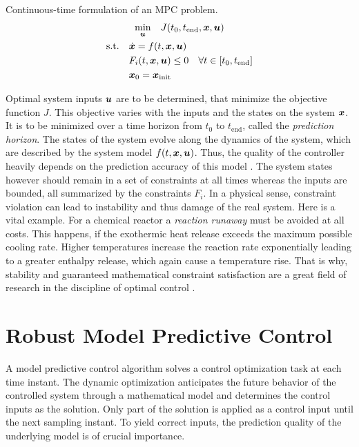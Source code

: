 \begin{definition} Continuous-time formulation of an MPC problem.
    \label{theory:def: general mpc}
    \[
        \begin{gathered}
            \underset{{\bm{u}}}{\min} \quad  J(t_0, t_\text{end}, {\bm{x}}, {\bm{u}}) \\
            \begin{aligned}
                \text{s.t.} \quad &\dot{{\bm{x}}} = f(t, {\bm{x}}, {\bm{u}}) \\
                & F_i(t, {\bm{x}}, {\bm{u}}) \leq 0 \quad \forall t \in [t_0, t_\text{end}] \\
                & {\bm{x}}_0 = {\bm{x}}_\text{init}
            \end{aligned}
        \end{gathered}
    \]
\end{definition}

Optimal system inputs ${\bm{u}}$ are to be determined, that minimize the objective function $J$. This objective
varies with the inputs and the states on the system ${\bm{x}}$. It is to be minimized over a time horizon
from $t_0$ to $t_\text{end}$, called the \emph{prediction horizon}. The states of the system evolve along
the dynamics of the system, which are described by the system model $f(t, {\bm{x}}, {\bm{u}})$. Thus, the quality
of the controller heavily depends on the prediction accuracy of this model \cite{lucia2013}.
The system states however should remain in a set of constraints at all times whereas the inputs
are bounded, all summarized by the constraints $F_i$. In a physical sense, constraint violation can lead to 
instability and thus damage of the real system. Here is a vital example.
For a chemical reactor a \emph{reaction runaway}
must be avoided at all costs. This happens, if the exothermic heat release exceeds the maximum possible
cooling rate. Higher temperatures increase the reaction rate exponentially leading to a greater 
enthalpy release, which again cause a temperature rise. That is why, stability and guaranteed mathematical constraint satisfaction
are a great field of research in the discipline of optimal control \cite{}.


\section{Robust Model Predictive Control}

A model predictive control algorithm solves a control optimization task at each time instant.
The dynamic optimization anticipates the future behavior of the controlled system through
a mathematical model and determines the control inputs as the solution. Only part of the 
solution is applied as a control input until the next sampling instant. To yield correct inputs,
the prediction quality of the underlying model is of crucial importance.
\newline
\newline

